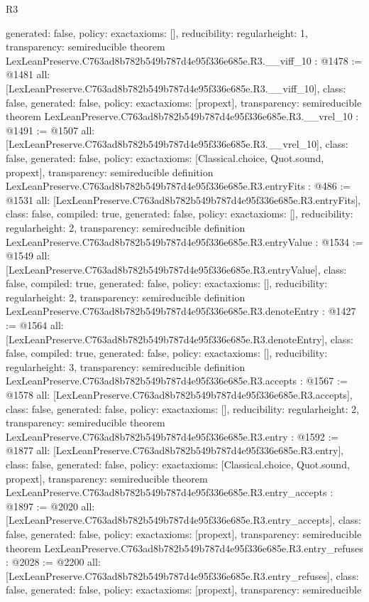 \begin{lexlean}{R3}
\begin{coremodule}
{  generated: false,
  policy: exact{axioms: []},
  reducibility: regular{height: 1},
  transparency: semireducible
}
theorem LexLeanPreserve.C763ad8b782b549b787d4e95f336e685e.R3.__viff_10 : @1478 := @1481 {
  all: [LexLeanPreserve.C763ad8b782b549b787d4e95f336e685e.R3.__viff_10],
  class: false,
  generated: false,
  policy: exact{axioms: [propext]},
  transparency: semireducible
}
theorem LexLeanPreserve.C763ad8b782b549b787d4e95f336e685e.R3.__vrel_10 : @1491 := @1507 {
  all: [LexLeanPreserve.C763ad8b782b549b787d4e95f336e685e.R3.__vrel_10],
  class: false,
  generated: false,
  policy: exact{axioms: [Classical.choice, Quot.sound, propext]},
  transparency: semireducible
}
definition LexLeanPreserve.C763ad8b782b549b787d4e95f336e685e.R3.entryFits : @486 := @1531 {
  all: [LexLeanPreserve.C763ad8b782b549b787d4e95f336e685e.R3.entryFits],
  class: false,
  compiled: true,
  generated: false,
  policy: exact{axioms: []},
  reducibility: regular{height: 2},
  transparency: semireducible
}
definition LexLeanPreserve.C763ad8b782b549b787d4e95f336e685e.R3.entryValue : @1534 := @1549 {
  all: [LexLeanPreserve.C763ad8b782b549b787d4e95f336e685e.R3.entryValue],
  class: false,
  compiled: true,
  generated: false,
  policy: exact{axioms: []},
  reducibility: regular{height: 2},
  transparency: semireducible
}
definition LexLeanPreserve.C763ad8b782b549b787d4e95f336e685e.R3.denoteEntry : @1427 := @1564 {
  all: [LexLeanPreserve.C763ad8b782b549b787d4e95f336e685e.R3.denoteEntry],
  class: false,
  compiled: true,
  generated: false,
  policy: exact{axioms: []},
  reducibility: regular{height: 3},
  transparency: semireducible
}
definition LexLeanPreserve.C763ad8b782b549b787d4e95f336e685e.R3.accepts : @1567 := @1578 {
  all: [LexLeanPreserve.C763ad8b782b549b787d4e95f336e685e.R3.accepts],
  class: false,
  generated: false,
  policy: exact{axioms: []},
  reducibility: regular{height: 2},
  transparency: semireducible
}
theorem LexLeanPreserve.C763ad8b782b549b787d4e95f336e685e.R3.entry : @1592 := @1877 {
  all: [LexLeanPreserve.C763ad8b782b549b787d4e95f336e685e.R3.entry],
  class: false,
  generated: false,
  policy: exact{axioms: [Classical.choice, Quot.sound, propext]},
  transparency: semireducible
}
theorem LexLeanPreserve.C763ad8b782b549b787d4e95f336e685e.R3.entry_accepts : @1897 := @2020 {
  all: [LexLeanPreserve.C763ad8b782b549b787d4e95f336e685e.R3.entry_accepts],
  class: false,
  generated: false,
  policy: exact{axioms: [propext]},
  transparency: semireducible
}
theorem LexLeanPreserve.C763ad8b782b549b787d4e95f336e685e.R3.entry_refuses : @2028 := @2200 {
  all: [LexLeanPreserve.C763ad8b782b549b787d4e95f336e685e.R3.entry_refuses],
  class: false,
  generated: false,
  policy: exact{axioms: [propext]},
  transparency: semireducible
}


\end{coremodule}
\end{lexlean}
